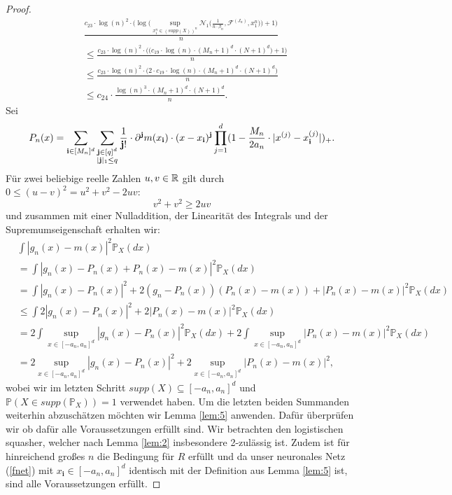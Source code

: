 \begin{proof}
\begin{equation}
\label{lem9sol}
\begin{split}
& \frac{c_{23} \cdot \log(n)^2 \cdot \big(\log\big(\sup_{x_1^n \in (supp(X))^n}\mathcal{N}_1\big(\frac{1}{n \cdot \beta_n},\mathcal{F}^{(J_n)},x_1^n\big)\big) + 1\big)}{n} \\
& \leq \frac{c_{23} \cdot \log(n)^2 \cdot \big(\big(c_{19} \cdot \log(n) \cdot (M_n + 1)^d \cdot (N + 1)^d \big) + 1\big)}{n} \\
& \leq \frac{c_{23} \cdot \log(n)^2 \cdot \big(2 \cdot c_{19} \cdot \log(n) \cdot (M_n + 1)^d \cdot (N + 1)^d\big)}{n} \\
& \leq c_{24} \cdot \frac{\log(n)^3 \cdot (M_n + 1)^d \cdot (N + 1)^d}{n}.
\end{split}
\end{equation}
Sei 
\begin{equation*}
\begin{split}
P_n(x) = \sum_{\mathbf{i} \in [M_n]^d} \sum_{\substack{ \mathbf{j} \in [q]^d \\ |\mathbf{j}|_1 \leq q}} \frac{1}{\mathbf{j}!} \cdot \partial^{\mathbf{j}} m (x_{\mathbf{i}}) \cdot (x - x_{\mathbf{i}})^{\mathbf{j}} \prod_{j = 1}^d(1 - \frac{M_n}{2a_n} \cdot |x^{(j)} - x_{\mathbf{i}}^{(j)}|)_+. 
\end{split}
\end{equation*}
Für zwei beliebige reelle Zahlen $u, v \in \mathbb{R}$ gilt durch $0 \leq (u - v)^2 = u^2 + v^2 - 2uv$:
$$v^2 + v^2 \geq 2uv$$ und zusammen mit einer Nulladdition, der Linearität des Integrals und der Supremumseigenschaft erhalten wir:
\begin{equation}
\label{gnmx}
\begin{split}
& \int |g_n(x) - m(x)|^2 \mathds{P}_X(dx) \\
& = \int |g_n(x) - P_n(x) + P_n(x) - m(x)|^2 \mathds{P}_X(dx) \\
& = \int |g_n(x) - P_n(x)|^2 + 2(g_n - P_n(x))(P_n(x) - m(x)) + |P_n(x) - m(x)|^2 \mathds{P}_X(dx) \\
& \leq \int 2 |g_n(x) - P_n(x)|^2 + 2 |P_n(x) - m(x)|^2 \mathds{P}_X(dx) \\
& = 2 \int \sup_{x \in [-a_n, a_n]^d} |g_n(x) - P_n(x)|^2 \mathds{P}_X(dx) + 2 \int \sup_{x \in [-a_n, a_n]^d} |P_n(x) - m(x)|^2 \mathds{P}_X(dx) \\
& = 2 \sup_{x \in [-a_n, a_n]^d} |g_n(x) - P_n(x)|^2 + 2 \sup_{x \in [-a_n, a_n]^d} |P_n(x) - m(x)|^2, 
\end{split}
\end{equation}
wobei wir im letzten Schritt $supp(X) \subseteq [-a_n, a_n]^d$ und $\mathds{P}(X \in supp(\mathds{P}_X)) = 1$ verwendet haben. Um die letzten beiden Summanden weiterhin abzuschätzen möchten wir Lemma \ref{lem:5} anwenden. Dafür überprüfen wir ob dafür alle Voraussetzungen erfüllt sind. Wir betrachten den logistischen squasher, welcher nach Lemma \ref{lem:2} insbesondere 2-zulässig ist. Zudem ist für hinreichend großes $n$ die Bedingung für $R$ erfüllt und da unser neuronales Netz (\ref{fnet}) mit $x_{\mathbf{i}} \in [-a_n, a_n]^d$ identisch mit der Definition aus Lemma \ref{lem:5} ist, sind alle Voraussetzungen erfüllt. 

\end{proof}
